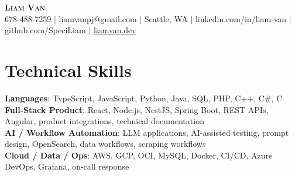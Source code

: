 \documentclass[letterpaper,11pt]{article}
\begin{document}

%
\begin{center}
    \textbf{\Huge \scshape Liam Van} \\ \vspace{1pt}
    \small 678-488-7259 $|$ \small {liamvanpj@gmail.com} $|$ Seattle, WA
 {{$|$ linkedin.com/in/liam-van} {$|$ github.com/SpeciLiam} {$|$ \href{https://liamvan.dev}{liamvan.dev}}}

\end{center}

\section{Technical Skills}
 \begin{itemize}[leftmargin=0.15in, label={}]
    \small{\item{
     \textbf{Languages}{: TypeScript, JavaScript, Python, Java, SQL, PHP, C++, C\#, C} \\
     \textbf{Full-Stack Product}{: React, Node.js, NestJS, Spring Boot, REST APIs, Angular, product integrations, technical documentation} \\
     \textbf{AI / Workflow Automation}{: LLM applications, AI-assisted testing, prompt design, OpenSearch, data workflows, scraping workflows} \\
     \textbf{Cloud / Data / Ops}{: AWS, GCP, OCI, MySQL, Docker, CI/CD, Azure DevOps, Grafana, on-call response} \\
    }}
 \end{itemize}
%
\end{document}
